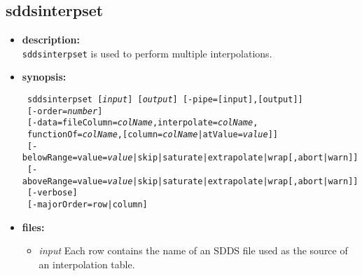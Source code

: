 \newpage 
\subsection{sddsinterpset} 
\label{sddsinterpset} 
 
\begin{itemize} 
\item {\bf description:} \hspace*{1mm}\\ 
{\tt sddsinterpset} is used to perform multiple interpolations.

\item {\bf synopsis:}  
\begin{flushleft}
{\tt 
sddsinterpset [{\em input}] [{\em output}] [-pipe=[input],[output]] \\ \
{}[-order={\em number}] \\ \
{}[-data=fileColumn={\em colName},interpolate={\em colName}, \\ \
 functionOf={\em colName},[column={\em colName}|atValue={\em value}]] \\ \
{}[-belowRange={value={\em value}|skip|saturate|extrapolate|wrap}[,{abort|warn}]] \\ \
{}[-aboveRange={value={\em value}|skip|saturate|extrapolate|wrap}[,{abort|warn}]] \\ \
{}[-verbose] \\ \
{}[-majorOrder=row|column]}
\end{flushleft} 

\item {\bf files:}
    \begin{itemize} 
    \item {\em input} Each row contains the name of an SDDS file used as the source of an interpolation table.
    \end{itemize} 


\end{itemize}
